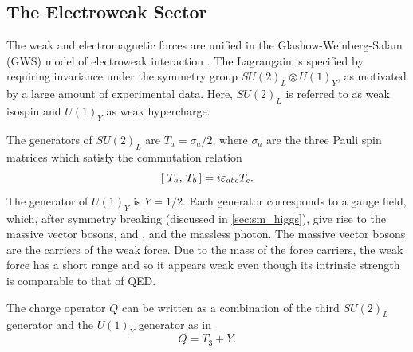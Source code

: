 \subsection{The Electroweak Sector}\label{sec:ew_sector}

The weak and electromagnetic forces are unified in the Glashow-Weinberg-Salam (GWS) model of electroweak interaction \cite{Glashow:1961tr,Weinberg:1967tq,Salam:1968rm}.
The Lagrangain is specified by requiring invariance under the symmetry group $SU(2)_L \otimes U(1)_Y$, as motivated by a large amount of experimental data.
Here, $SU(2)_L$ is referred to as weak isospin and $U(1)_Y$ as weak hypercharge.

The generators of $SU(2)_L$ are $T_a = \sigma_a/2$, where $\sigma_a$ are the three Pauli spin matrices which satisfy the commutation relation 
%
\begin{equation}
[\; T_a,\,T_b\,] = i \varepsilon_{abc} T_c .
\end{equation}
%
The generator of $U(1)_Y$ is $Y = 1/2$.
Each generator corresponds to a gauge field, which, after symmetry breaking (discussed in \cref{sec:sm_higgs}), give rise to the massive vector bosons, \Wpm and \Zboson, and the massless photon.
The massive vector bosons are the carriers of the weak force.
Due to the mass of the force carriers, the weak force has a short range and so it appears weak even though its intrinsic strength is comparable to that of QED.

The charge operator $Q$ can be written as a combination of the third $SU(2)_L$ generator and the $U(1)_Y$ generator as in
%
\begin{equation}\label{eq:charge_operator}
  Q = T_3 + Y .
\end{equation}
%

